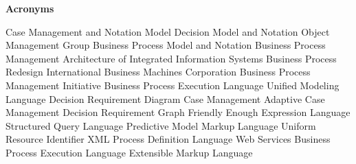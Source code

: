\clearemptydoublepage
{}
{}	




\vspace*{2cm}

\begin{center}
{\Large \bf Acronyms}
\end{center}
\vspace{1cm}

\begin{acronym}[bash]
 {Case Management and Notation Model}
 {Decision Model and Notation}
 {Object Management Group}
 {Business Process Model and Notation}
 {Business Process Management}
 {Architecture of Integrated Information Systems}
 {Business Process Redesign} 
 {International Business Machines Corporation}
 {Business Process Management Initiative}
 {Business Process Execution Language}
 {Unified Modeling Language}
 {Decision Requirement Diagram}
 {Case Management}
 {Adaptive Case Management}
 {Decision Requirement Graph}
 {Friendly Enough Expression Language}
 {Structured Query Language}
 {Predictive Model Markup Language}
 {Uniform Resource Identifier}
 {XML Process Definition Language} 
 {Web Services Business Process Execution Language} 
 {Extensible Markup Language} 
\end{acronym}
